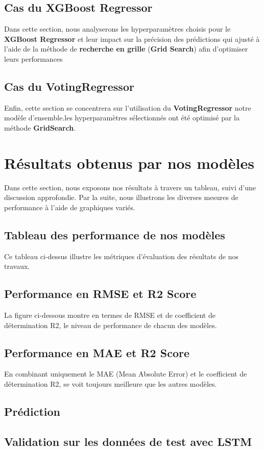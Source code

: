 \subsection{Cas du XGBoost Regressor}
Dans cette section, nous analyserons les hyperparamètres choisis pour le \textbf{XGBoost Regressor} et leur impact sur la précision des prédictions qui ajusté à l’aide de la méthode de \textbf{recherche en grille} (\textbf{Grid Search}) afin d’optimiser leurs performances

\subsection{Cas du VotingRegressor}
Enfin, cette section se concentrera sur l’utilisation du \textbf{VotingRegressor} notre modèle d'ensemble.les hyperparamètres sélectionnés ont été optimisé par la méthode \textbf{GridSearch}.

\section{Résultats obtenus par nos modèles}
Dans cette section, nous exposons nos résultats à travers un tableau, suivi d’une discussion approfondie. Par la suite, nous illustrons les diverses mesures de performance à l’aide de graphiques variés.
\subsection{Tableau des performance de nos modèles}
Ce tableau ci-dessus illustre les métriques d’évaluation des résultats de nos travaux.
\subsection{Performance en RMSE et R2 Score}
La figure ci-dessous montre en termes de RMSE et de coefficient de détermination R2, le niveau de performance de chacun des modèles.
\subsection{Performance en MAE et R2 Score}
En combinant uniquement le MAE (Mean Absolute Error) et le coefficient de détermination R2,  se voit toujours meilleure que les autres modèles.
\subsection{Prédiction}
\subsection{Validation sur les données de test avec LSTM}
